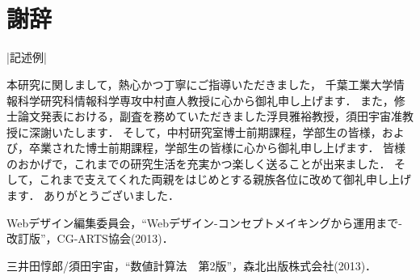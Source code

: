 \documentclass[12pt]{ltjsreport}%
\begin{document}
\chapter*{　\\謝辞}
|記述例|

本研究に関しまして，熱心かつ丁寧にご指導いただきました，
千葉工業大学情報科学研究科情報科学専攻中村直人教授に心から御礼申し上げます．
また，修士論文発表における，副査を務めていただきました浮貝雅裕教授，須田宇宙准教授に深謝いたします．
そして，中村研究室博士前期課程，学部生の皆様，および，卒業された博士前期課程，学部生の皆様に心から御礼申し上げます．
皆様のおかげで，これまでの研究生活を充実かつ楽しく送ることが出来ました．
そして，これまで支えてくれた両親をはじめとする親族各位に改めて御礼申し上げます．
ありがとうございました．


\begin{thebibliography}{99}

Webデザイン編集委員会，“Webデザイン-コンセプトメイキングから運用まで-　改訂版”，CG-ARTS協会(2013)．

三井田惇郎/須田宇宙，“数値計算法　第2版”，森北出版株式会社(2013)．


\end{thebibliography}
\end{document}

